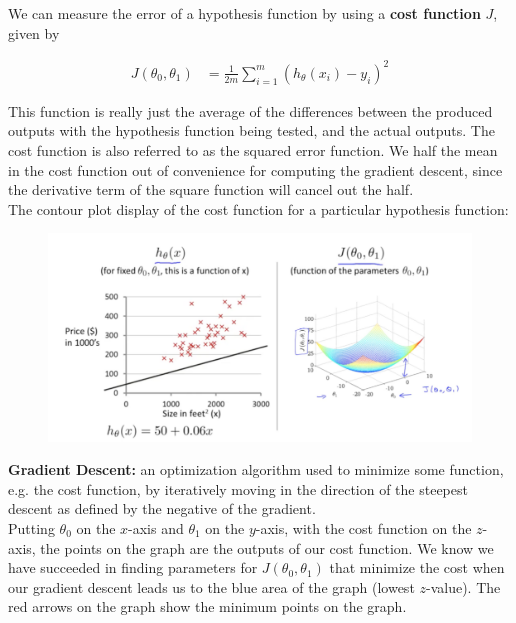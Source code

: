 \noindent We can measure the error of a hypothesis function by using a \textbf{cost function} $J$,
given by

\begin{align*}
    J(\theta_0,\theta_1)    &= \frac{1}{2m}\sum^m_{i=1}(h_\theta(x_i)-y_i)^2
\end{align*}

\noindent This function is really just the average of the differences between the produced outputs
with the hypothesis function being tested, and the actual outputs. The cost function is also referred
to as the squared error function. We half the mean in the cost function out of convenience for
computing the gradient descent, since the derivative term of the square function will cancel out the
half. \\

\noindent The contour plot display of the cost function for a particular hypothesis function:

\begin{figure}[hbt!]
    \centering
    \includegraphics[scale=0.75]{Resources/Contour.PNG}
\end{figure}

\noindent \textbf{Gradient Descent:} an optimization algorithm used to minimize some function, e.g. the
cost function, by iteratively moving in the direction of the steepest descent as defined by the negative
of the gradient. \\

\noindent Putting $\theta_0$ on the $x$-axis and $\theta_1$ on the $y$-axis, with the cost function
on the $z$-axis, the points on the graph are the outputs of our cost function. We know we have succeeded
in finding parameters for $J(\theta_0,\theta_1)$ that minimize the cost when our gradient descent leads
us to the blue area of the graph (lowest $z$-value). The red arrows on the graph show the minimum points
on the graph.

